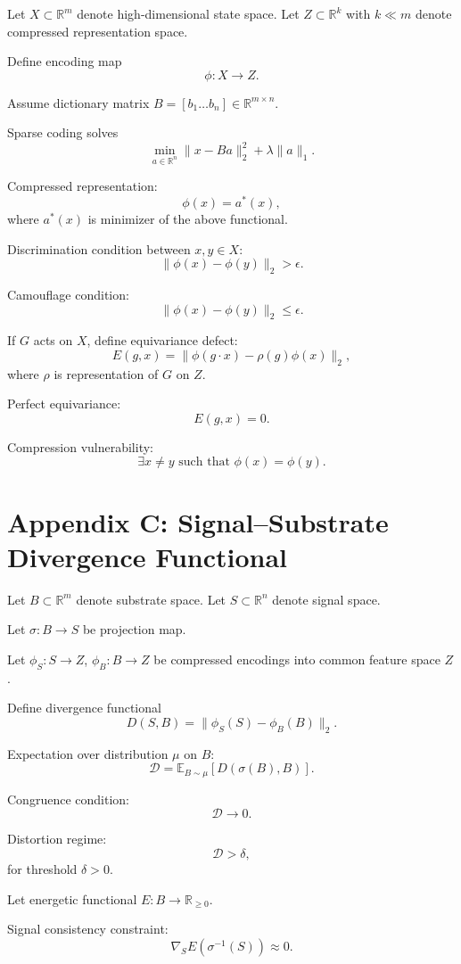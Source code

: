 \documentclass[11pt]{article}
\begin{document}
Let $X \subset \mathbb{R}^m$ denote high-dimensional state space.  
Let $Z \subset \mathbb{R}^k$ with $k \ll m$ denote compressed representation space.

Define encoding map
\[
\phi : X \to Z.
\]

Assume dictionary matrix $B = [b_1 \dots b_n] \in \mathbb{R}^{m \times n}$.

Sparse coding solves
\[
\min_{a \in \mathbb{R}^n} \|x - Ba\|_2^2 + \lambda \|a\|_1.
\]

Compressed representation:
\[
\phi(x) = a^*(x),
\]
where $a^*(x)$ is minimizer of the above functional.

Discrimination condition between $x,y \in X$:
\[
\|\phi(x) - \phi(y)\|_2 > \epsilon.
\]

Camouflage condition:
\[
\|\phi(x) - \phi(y)\|_2 \le \epsilon.
\]

If $G$ acts on $X$, define equivariance defect:
\[
E(g,x) = \|\phi(g \cdot x) - \rho(g)\phi(x)\|_2,
\]
where $\rho$ is representation of $G$ on $Z$.

Perfect equivariance:
\[
E(g,x)=0.
\]

Compression vulnerability:
\[
\exists x \ne y \text{ such that } \phi(x)=\phi(y).
\]

\section{Appendix C: Signal–Substrate Divergence Functional}

Let $B \subset \mathbb{R}^m$ denote substrate space.  
Let $S \subset \mathbb{R}^n$ denote signal space.

Let $\sigma : B \to S$ be projection map.

Let $\phi_S : S \to Z$, $\phi_B : B \to Z$ be compressed encodings into common feature space $Z$.

Define divergence functional
\[
D(S,B) = \|\phi_S(S) - \phi_B(B)\|_2.
\]

Expectation over distribution $\mu$ on $B$:
\[
\mathcal{D} = \mathbb{E}_{B \sim \mu} \left[ D(\sigma(B),B) \right].
\]

Congruence condition:
\[
\mathcal{D} \to 0.
\]

Distortion regime:
\[
\mathcal{D} > \delta,
\]
for threshold $\delta > 0$.

Let energetic functional $E : B \to \mathbb{R}_{\ge 0}$.

Signal consistency constraint:
\[
\nabla_S E(\sigma^{-1}(S)) \approx 0.
\]
\end{document}
